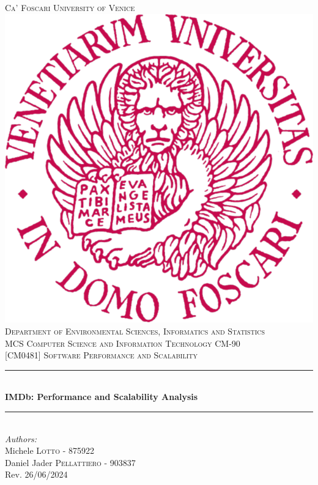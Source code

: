 \documentclass[12pt, twoside]{report}
\begin{document}

	\begin{titlepage}

		\renewcommand{\thesection}{\arabic{section}}
		\newcommand{\HRule}{\rule{\linewidth}{0.2mm}}
		
		\center

		\textsc{\Large Ca' Foscari University of Venice }\\[1.0cm]
		\includegraphics[scale=0.85]{ unive-emblem.png }\\[1cm]
		\textsc{\Large Department of Environmental Sciences, Informatics and Statistics }\\[0.5cm]
		\textsc{\large MCS Computer Science and Information Technology CM-90 }\\[0.5cm]
		\textsc{\large [CM0481] Software Performance and Scalability }\\[0.5cm]
		
		\HRule \\[0.8cm]
		{ \Huge \bfseries IMDb: Performance and Scalability Analysis }\\[0.5cm]
		\HRule \\[0.8cm]
		
		\Large \emph{Authors:}\\
		Michele \textsc{Lotto} - {\normalsize 875922}\\
		Daniel Jader \textsc{Pellattiero} - {\normalsize 903837}\\[3.5cm]

		{\large Rev. 26/06/2024  }\\
		
		\vfill
		
	\end{titlepage}
\end{document}
